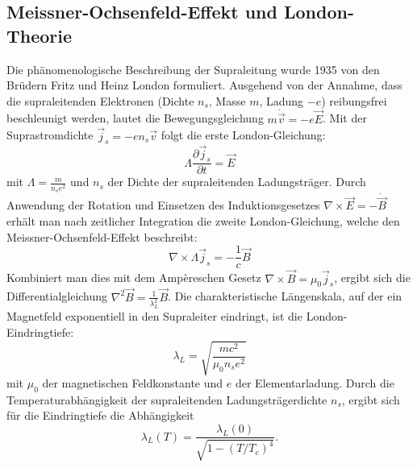 \subsection{Meissner-Ochsenfeld-Effekt und London-Theorie}
Die phänomenologische Beschreibung der Supraleitung wurde 1935 von den Brüdern Fritz und Heinz London formuliert. Ausgehend von der Annahme, dass die supraleitenden Elektronen (Dichte $n_s$, Masse $m$, Ladung $-e$) reibungsfrei beschleunigt werden, lautet die Bewegungsgleichung $m \dot{\vec{v}} = -e \vec{E}$. Mit der Suprastromdichte $\vec{j}_s = -e n_s \vec{v}$ folgt die erste London-Gleichung:
\begin{equation}
    \Lambda \frac{\partial \vec{j}_s}{\partial t} = \vec{E}
\end{equation}
mit $\Lambda = \frac{m}{n_s e^2}$ und $n_s$ der Dichte der supraleitenden Ladungsträger.
Durch Anwendung der Rotation und Einsetzen des Induktionsgesetzes $\nabla \times \vec{E} = -\dot{\vec{B}}$ erhält man nach zeitlicher Integration die zweite London-Gleichung, welche den Meissner-Ochsenfeld-Effekt beschreibt:
\begin{equation}
    \nabla \times \Lambda \vec{j}_s = -\frac{1}{c} \vec{B}
\end{equation}
Kombiniert man dies mit dem Ampèreschen Gesetz $\nabla \times \vec{B} = \mu_0 \vec{j}_s$, ergibt sich die Differentialgleichung $\nabla^2 \vec{B} = \frac{1}{\lambda_L^2} \vec{B}$. Die charakteristische Längenskala, auf der ein Magnetfeld exponentiell in den Supraleiter eindringt, ist die London-Eindringtiefe:
\begin{equation}
    \lambda_L = \sqrt{\frac{m c^2}{\mu_0 n_s e^2}}
\end{equation}
mit $\mu_0$ der magnetischen Feldkonstante und $e$ der Elementarladung.
Durch die Temperaturabhängigkeit der supraleitenden Ladungsträgerdichte $n_s$, ergibt sich für die Eindringtiefe die Abhängigkeit
\begin{equation}
    \lambda_L (T) = \frac{\lambda_L(0)}{\sqrt{1 - (T/T_c)^4}}.
\end{equation}

